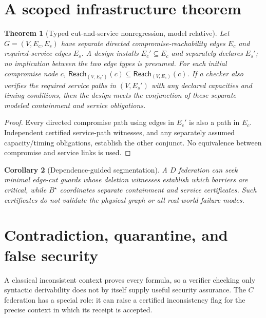 \documentclass[11pt,letterpaper,oneside]{book}
\newtheorem{theorem}{Theorem}[chapter]
\newtheorem{corollary}[theorem]{Corollary}
\theoremstyle{definition}
\theoremstyle{remark}
\newcommand{\Reach}{\mathsf{Reach}}
\begin{document}
\section{A scoped infrastructure theorem}
\begin{theorem}[Typed cut-and-service nonregression, model relative]
Let $G=(V,E_c,E_s)$ have separate directed compromise-reachability
edges $E_c$ and required-service edges $E_s$. A design installs
$E_c'\subseteq E_c$ and separately declares $E_s'$; no implication
between the two edge types is presumed. For each initial compromise
node $c$, $\Reach_{(V,E_c')}(c)\subseteq\Reach_{(V,E_c)}(c)$.
If a checker also verifies the required service paths in $(V,E_s')$
with any declared capacities and timing conditions, then the design
meets the conjunction of these \emph{separate modeled} containment
and service obligations.
\end{theorem}
\begin{proof}
Every directed compromise path using edges in $E_c'$ is also a
path in $E_c$. Independent certified service-path witnesses, and
any separately assumed capacity/timing obligations, establish the
other conjunct. No equivalence between compromise and service links
is used.
\end{proof}
\begin{corollary}[Dependence-guided segmentation]
A $D$ federation can seek minimal edge-cut guards whose deletion
witnesses establish which barriers are critical, while $B^\star$
coordinates separate containment and service certificates. Such
certificates do not validate the physical graph or all real-world
failure modes.\end{corollary}

\section{Contradiction, quarantine, and false security}
A classical inconsistent context proves every formula, so a
verifier checking only syntactic derivability does not by itself
supply useful security assurance. The $C$ federation has a special
role: it can raise a certified inconsistency flag for the precise
context in which its receipt is accepted.
\end{document}
